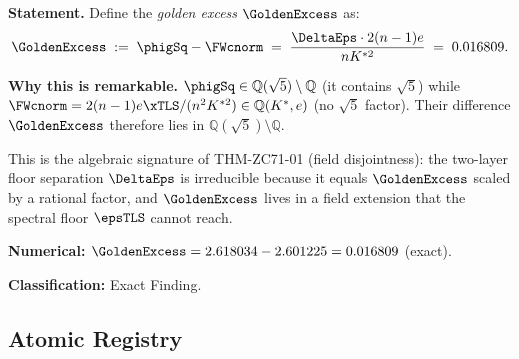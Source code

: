 \documentclass[12pt, a4paper]{article}
\begin{document}
\begin{derivedbox}[title={FIND-ZC80-02: Golden Excess Identity ---
  Algebraic Signature of the Two-Layer Separation ($R_0$, Exact)}]

\textbf{Statement.}
Define the \emph{golden excess} $\GoldenExcess$ as:
\begin{equation}
  \GoldenExcess
  \;:=\;
  \phigSq - \FWcnorm
  \;=\;
  \frac{\DeltaEps \cdot 2(n-1)e}{n K^{*2}}
  \;=\; 0.016809.
  \label{eq:golden-excess}
\end{equation}

\textbf{Why this is remarkable.}
$\phigSq \in \mathbb{Q}(\sqrt{5})\setminus\mathbb{Q}$
(it contains $\sqrt{5}$) while
$\FWcnorm = 2(n-1)e\xTLS/(n^2K^{*2}) \in \mathbb{Q}(K^*,e)$
(no $\sqrt{5}$ factor).
Their difference $\GoldenExcess$ therefore lies in
$\mathbb{Q}(\sqrt{5})\setminus\mathbb{Q}$.

This is the algebraic signature of THM-ZC71-01
(field disjointness): the two-layer floor separation
$\DeltaEps$ is irreducible because it equals
$\GoldenExcess$ scaled by a rational factor, and
$\GoldenExcess$ lives in a field extension
that the spectral floor $\epsTLS$ cannot reach.

\textbf{Numerical:}
$\GoldenExcess = 2.618034 - 2.601225 = 0.016809$ (exact).

\textbf{Classification:} Exact Finding.
\end{derivedbox}

\subsection{Atomic Registry}
\label{sec:registry}
\end{document}
